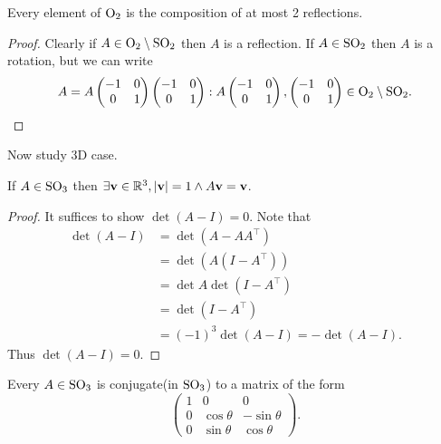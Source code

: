 \documentclass[10pt]{article}
\begin{document}
    \begin{corollary}\label{col:7.20}
            Every element of $\mathrm{O}_2$ is the composition of at most 2 reflections.
    \end{corollary}
    \begin{proof}
        Clearly if $ A\in  \mathrm{O}_2 \setminus \mathrm{SO}_2$ then $A$ is a reflection. If $ A\in \mathrm{SO}_2 $ then $A$ is a rotation, but we can write 
        \[
            A=A\begin{pmatrix}
                -1&0\\
                0&1
            \end{pmatrix}\begin{pmatrix}
                -1&0\\
                0&1
            \end{pmatrix}: A\begin{pmatrix}
                -1&0\\
                0&1
            \end{pmatrix},\begin{pmatrix}
                -1&0\\
                0&1
            \end{pmatrix}\in \mathrm{O}_2 \setminus \mathrm{SO}_2.
        \]
    \end{proof}
    Now study 3D case.
    \begin{theorem}\label{thm:7.21}
        If $ A\in \mathrm{SO}_3 $ then $ \exists {\bf v}\in \mathbb{R}^{3}, |{\bf v}|=1 \land  A{\bf v}={\bf v} $.
    \end{theorem}
    \begin{proof}
        It suffices to show $ \det (A-I)=0 $. Note that 
        \begin{align*}
            \det (A-I)&= \det (A-A A^\top)\\
            &= \det (A(I-A^\top))\\
            &= \det A \det (I-A^\top)\\
            &= \det (I-A^\top)\\
            &= (-1)^3\det(A-I)=-\det (A-I). 
        \end{align*}
        Thus $ \det (A-I)=0 $.
    \end{proof}
    \begin{corollary}\label{col:7.22}
        Every $ A\in \mathrm{SO}_3 $ is conjugate(in $ \mathrm{SO}_3 $) to a matrix of the form 
        \[
            \begin{pmatrix}
                1&0&0\\
                0&\cos \theta& -\sin \theta\\
                0&\sin \theta& \cos \theta
            \end{pmatrix}.
        \]
    \end{corollary}
\end{document}
